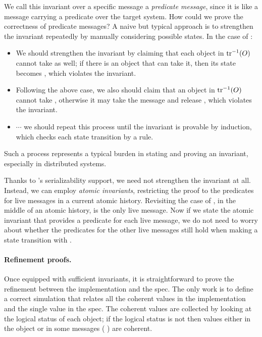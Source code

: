 We call this invariant over a specific message a \emph{predicate message}, since it is like a message carrying a predicate over the target system.
How could we prove the correctness of predicate messages?
A naive but typical approach is to strengthen the invariant repeatedly by manually considering possible states.
In the case of :
\begin{itemize}[leftmargin=*]
\item We should strengthen the invariant by claiming that each object in $\textrm{tr}^{-1}(O)$ cannot take  as well; if there is an object that can take it, then its state becomes \stS{}, which violates the invariant.
\item Following the above case, we also should claim that an object in $\textrm{tr}^{-1}(O)$ cannot take , otherwise it may take the message and release , which violates the invariant.
\item $\cdots$ we should repeat this process until the invariant is provable by induction, which checks each state transition by a rule.
\end{itemize}
Such a process represents a typical burden in stating and proving an invariant, especially in distributed systems.

Thanks to \hemiola{}'s serializability support, we need not strengthen the invariant at all.
Instead, we can employ \emph{atomic invariants}, restricting the proof to the predicates for live messages in a current atomic history.
Revisiting the case of , in the middle of an atomic history,  is the only live message.
Now if we state the atomic invariant that provides a predicate for each live message, we do not need to worry about whether the predicates for the other live messages still hold when making a state transition with .

\paragraph{Refinement proofs.}

\newcommand{\implcoh}[3]{\ensuremath{\textit{Coh}\,(#1, #2, #3)}}
\newcommand{\speccoh}[1]{\ensuremath{\textit{Spec}\,(v)}}

Once equipped with sufficient invariants, it is straightforward to prove the refinement between the implementation and the spec.
The only work is to define a correct simulation that relates all the coherent values in the implementation and the single value in the spec.
The coherent values are collected by looking at the logical status of each object; if the logical status is not \stI{} then values either in the object or in some messages (\eg{} ) are coherent.


